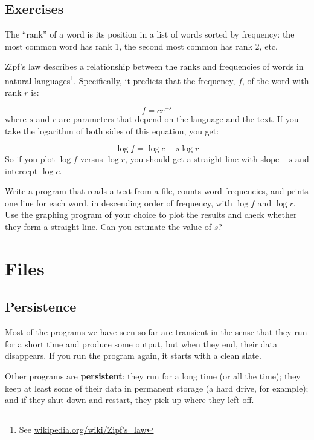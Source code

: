\documentclass[10pt]{book}
\begin{document}
\section{Exercises}

\begin{ex}


The ``rank'' of a word is its position in a list of words
sorted by frequency: the most common word has rank 1, the
second most common has rank 2, etc.

Zipf's law describes a relationship between the ranks and frequencies
of words in natural languages\footnote{See
  \url{wikipedia.org/wiki/Zipf's_law}}.  Specifically, it
predicts that the frequency, $f$, of the word with rank $r$ is:

\[ f = c r^{-s} \]
%
where $s$ and $c$ are parameters that depend on the language and the
text.  If you take the logarithm of both sides of this equation, you
get:


\[ \log f = \log c - s \log r \]
%
So if you plot $\log f$ versus $\log r$, you should get
a straight line with slope $-s$ and intercept $\log c$.

Write a program that reads a text from a file, counts
word frequencies, and prints one line
for each word, in descending order of frequency, with
$\log f$ and $\log r$.  Use the graphing program of your
choice to plot the results and check whether they form
a straight line.  Can you estimate the value of $s$?
\end{ex}


\chapter{Files}



\section{Persistence}


Most of the programs we have seen so far are transient in the
sense that they run for a short time and produce some output,
but when they end, their data disappears.  If you run the program
again, it starts with a clean slate.

Other programs are {\bf persistent}: they run for a long time
(or all the time); they keep at least some of their data
in permanent storage (a hard drive, for example); and
if they shut down and restart, they pick up where they left off.
\end{document}
